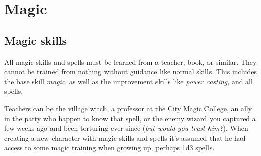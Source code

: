 




\cleardoublepage

\chapter*{Magic}



\section*{Magic skills}

All magic skills and spells must be learned from a teacher, book, or similar. They cannot be trained from nothing without guidance like normal skills. This includes the base skill \emph{magic}, as well as the improvement skills like \emph{power casting}, and all spells.

Teachers can be the village witch, a professor at the City Magic College, an ally in the party who happen to know that spell, or the enemy wizard you captured a few weeks ago and been torturing ever since (\emph{but would you trust him?}). When creating a new character with magic skills and spells it's assumed that he had access to some magic training when growing up, perhaps 1d3 spells.


